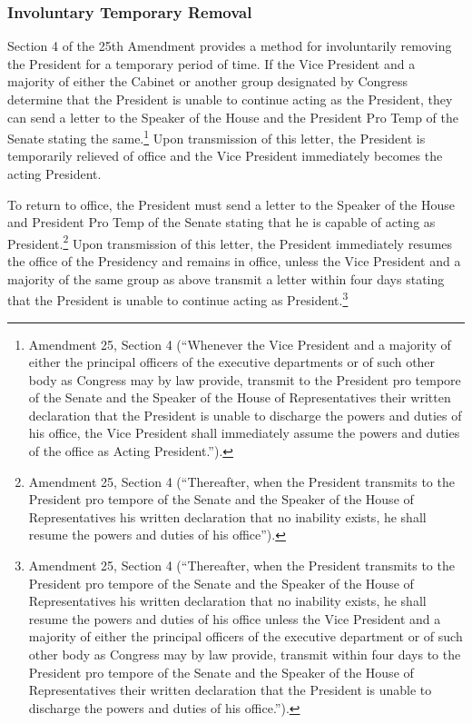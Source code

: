 \subsubsection{Involuntary Temporary Removal}
Section 4 of the 25th Amendment provides a method for involuntarily removing the President for a temporary period of time.
If the Vice President and a majority of either the Cabinet or another group designated by Congress determine that the President is unable to continue acting as the President, they can send a letter to the Speaker of the House and the President Pro Temp of the Senate stating the same.\footnote{Amendment 25, Section 4 (``Whenever the Vice President and a majority of either the principal officers of the executive departments or of such other body as Congress may by law provide, transmit to the President pro tempore of the Senate and the Speaker of the House of Representatives their written declaration that the President is unable to discharge the powers and duties of his office, the Vice President shall immediately assume the powers and duties of the office as Acting President.'').}
Upon transmission of this letter, the President is temporarily relieved of office and the Vice President immediately becomes the acting President.

To return to office, the President must send a letter to the Speaker of the House and President Pro Temp of the Senate stating that he is capable of acting as President.\footnote{Amendment 25, Section 4 (``Thereafter, when the President transmits to the President pro tempore of the Senate and the Speaker of the House of Representatives his written declaration that no inability exists, he shall resume the powers and duties of his office'').}
Upon transmission of this letter, the President immediately resumes the office of the Presidency and remains in office, unless the Vice President and a majority of the same group as above transmit a letter within four days stating that the President is unable to continue acting as President.\footnote{Amendment 25, Section 4 (``Thereafter, when the President transmits to the President pro tempore of the Senate and the Speaker of the House of Representatives his written declaration that no inability exists, he shall resume the powers and duties of his office unless the Vice President and a majority of either the principal officers of the executive department or of such other body as Congress may by law provide, transmit within four days to the President pro tempore of the Senate and the Speaker of the House of Representatives their written declaration that the President is unable to discharge the powers and duties of his office.'').}

